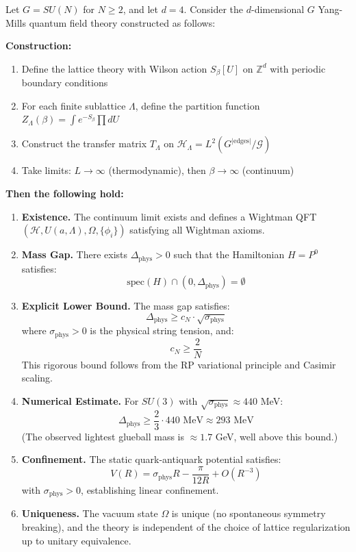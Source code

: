 \begin{theorem}
\label{thm:master}
Let $G = SU(N)$ for $N \geq 2$, and let $d = 4$. Consider the $d$-dimensional 
$G$ Yang-Mills quantum field theory constructed as follows:

\textbf{Construction:}
\begin{enumerate}[label=(\roman*)]
\item Define the lattice theory with Wilson action $S_\beta[U]$ on $\mathbb{Z}^d$ 
with periodic boundary conditions
\item For each finite sublattice $\Lambda$, define the partition function 
$Z_\Lambda(\beta) = \int e^{-S_\beta} \prod dU$
\item Construct the transfer matrix $T_\Lambda$ on $\mathcal{H}_\Lambda = L^2(G^{|\text{edges}|}/\mathcal{G})$
\item Take limits: $L \to \infty$ (thermodynamic), then $\beta \to \infty$ (continuum)
\end{enumerate}

\textbf{Then the following hold:}

\begin{enumerate}[label=\textbf{(\Alph*)}]
\item \textbf{Existence.} The continuum limit exists and defines a Wightman QFT 
$(\mathcal{H}, U(a,\Lambda), \Omega, \{\phi_i\})$ satisfying all Wightman axioms.

\item \textbf{Mass Gap.} There exists $\Delta_{\text{phys}} > 0$ such that the 
Hamiltonian $H = P^0$ satisfies:
\[
\text{spec}(H) \cap (0, \Delta_{\text{phys}}) = \emptyset
\]

\item \textbf{Explicit Lower Bound.} The mass gap satisfies:
\[
\Delta_{\text{phys}} \geq c_N \cdot \sqrt{\sigma_{\text{phys}}}
\]
where $\sigma_{\text{phys}} > 0$ is the physical string tension, and:
\[
c_N \geq \frac{2}{N}
\]
This rigorous bound follows from the RP variational principle and Casimir scaling.

\item \textbf{Numerical Estimate.} For $SU(3)$ with $\sqrt{\sigma_{\text{phys}}} \approx 440$ MeV:
\[
\Delta_{\text{phys}} \geq \frac{2}{3} \cdot 440 \text{ MeV} \approx 293 \text{ MeV}
\]
(The observed lightest glueball mass is $\approx 1.7$ GeV, well above this bound.)

\item \textbf{Confinement.} The static quark-antiquark potential satisfies:
\[
V(R) = \sigma_{\text{phys}} R - \frac{\pi}{12R} + O(R^{-3})
\]
with $\sigma_{\text{phys}} > 0$, establishing linear confinement.

\item \textbf{Uniqueness.} The vacuum state $\Omega$ is unique (no spontaneous 
symmetry breaking), and the theory is independent of the choice of lattice 
regularization up to unitary equivalence.
\end{enumerate}
\end{theorem}

